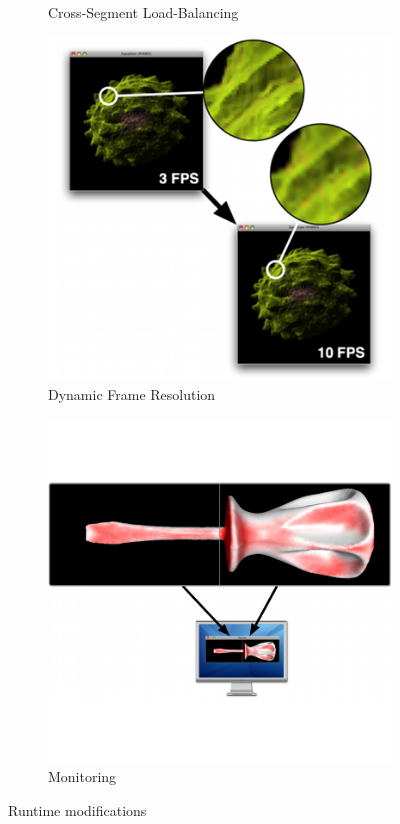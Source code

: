 \documentclass[10pt,journal,compsoc]{IEEEtran}
\begin{document}
\begin{figure}[ht]
\begin{subfigure}[b]{0.24\textwidth}
      \caption{\label{fig:vieweq}Cross-Segment Load-Balancing}
  \end{subfigure}
  \begin{subfigure}[b]{0.24\textwidth}
    \includegraphics[width=\textwidth]{images/dfr}
      \caption{\label{fig:dfr}Dynamic Frame Resolution}
  \end{subfigure}
  \begin{subfigure}[b]{0.24\textwidth}
    \includegraphics[width=\textwidth]{images/monitoreq}
      \caption{\label{fig:monitor}Monitoring}
  \end{subfigure}
  \caption{Runtime modifications}
  \label{fig:equalizers}
\end{figure}
\end{document}
